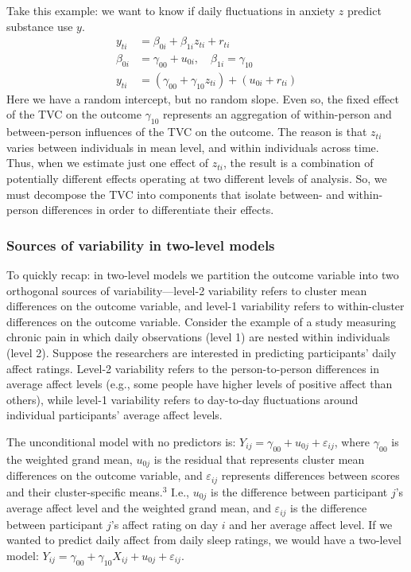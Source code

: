 Take this example: we want to know if daily fluctuations in anxiety $z$ predict substance use $y$.
\begin{equation}
    \begin{split}
        y_{ti} &= \beta_{0i} + \beta_{1i} z_{ti} + r_{ti} \\
        \beta_{0i} &= \gamma_{00} + u_{0i}, \quad \beta_{1i} = \gamma_{10} \\
        y_{ti} &= (\gamma_{00} + \gamma_{10} z_{ti}) + (u_{0i} + r_{ti})
    \end{split}
\end{equation}
Here we have a random intercept, but no random slope. Even so, the fixed effect of the TVC on the outcome $\gamma_{10}$ represents an aggregation of within-person and between-person influences of the TVC on the outcome. The reason is that $z_{ti}$ varies between individuals in mean level, and within individuals across time. Thus, when we estimate just one effect of $z_{ti}$, the result is a combination of potentially different effects operating at two different levels of analysis. So, we must decompose the TVC into components that isolate between- and within-person differences in order to differentiate their effects. 

\subsubsection{Sources of variability in two-level models}
To quickly recap: in two-level models we partition the outcome variable into two orthogonal sources of variability---level-2 variability refers to cluster mean differences on the outcome variable, and level-1 variability refers to within-cluster differences on the outcome variable. Consider the example of a study measuring chronic pain in which daily observations (level 1) are nested within individuals (level 2). Suppose the researchers are interested in predicting participants' daily affect ratings. Level-2 variability refers to the person-to-person differences in average affect levels (e.g., some people have higher levels of positive affect than others), while level-1 variability refers to day-to-day fluctuations around individual participants' average affect levels.

The unconditional model with no predictors is: $Y_{ij} = \gamma_{00} + u_{0j} + \varepsilon_{ij}$, where $\gamma_{00}$ is the weighted grand mean, $u_{0j}$ is the residual that represents cluster mean differences on the outcome variable, and $\varepsilon_{ij}$ represents differences between scores and their cluster-specific means.$^3$ I.e., $u_{0j}$ is the difference between participant $j$'s average affect level and the weighted grand mean, and $\varepsilon_{ij}$ is the difference between participant $j$'s affect rating on day $i$ and her average affect level. If we wanted to predict daily affect from daily sleep ratings, we would have a two-level model: $Y_{ij} = \gamma_{00} + \gamma_{10} X_{ij} + u_{0j} + \varepsilon_{ij}$.

